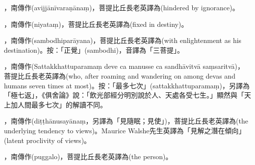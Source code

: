 \startitemgroup[noteitems]
\item{}，南傳作(avijjānīvaraṇānaṃ)，菩提比丘長老英譯為(hindered by ignorance)。
\stopitemgroup

\startitemgroup[noteitems]
\item{}，南傳作(niyataṃ)，菩提比丘長老英譯為(fixed in destiny)。
\stopitemgroup

\startitemgroup[noteitems]
\item{}，南傳作(sambodhiparāyana)，菩提比丘長老英譯為(with enlightenment as his destination)。按：「正覺」(sambodhi)，音譯為「三菩提」。
\stopitemgroup

\startitemgroup[noteitems]
\item{}，南傳作(Sattakkhattuparamaṃ deve ca manusse ca sandhāvitvā saṃsaritvā)，菩提比丘長老英譯為(who, after roaming and wandering on among devas and humans seven times at most)。按：「最多七次」(sattakkhattuparamaṃ)，另譯為「極七返」，《俱舍論》說：「飲光部經分明別說於人、天處各受七生。」顯然與「天上加人間最多七次」的解讀不同。
\stopitemgroup

\startitemgroup[noteitems]
\item{}，南傳作(diṭṭhānusayānaṃ，另譯為「見隨眠；見使」)，菩提比丘長老英譯為(the underlying tendency to views)。Maurice Walshe先生英譯為「見解之潛在傾向」(latent proclivity of views)。
\stopitemgroup

\startitemgroup[noteitems]
\item{}，南傳作(puggalo)，菩提比丘長老英譯為(the person)。
\stopitemgroup


